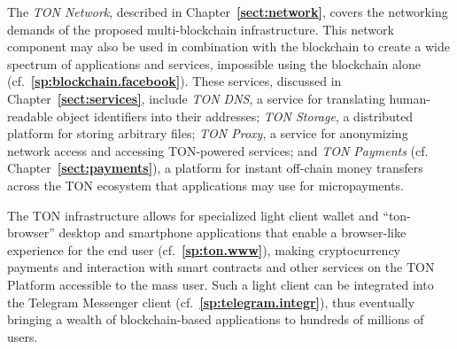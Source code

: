 \documentclass[12pt,oneside]{article}
\def\refpoint#1{{\rm\textbf{\ref{#1}}}}
\let\ptref=\refpoint
\def\markbothsame#1{\fancyhead[C]{#1}}
\begin{document}
The {\em TON Network}, described in Chapter~\ptref{sect:network},
covers the networking demands of the proposed multi-blockchain
infrastructure. This network component may also be used in combination
with the blockchain to create a wide spectrum of applications and
services, impossible using the blockchain alone
(cf.~\ptref{sp:blockchain.facebook}). These services, discussed in
Chapter~\ptref{sect:services}, include {\em TON DNS}, a service for
translating human-readable object identifiers into their addresses;
{\em TON Storage}, a distributed platform for storing arbitrary files;
{\em TON Proxy}, a service for anonymizing network access and
accessing TON-powered services; and {\em TON Payments\/}
(cf. Chapter~\ptref{sect:payments}), a platform for instant off-chain
money transfers across the TON ecosystem that applications may use for
micropayments.

The TON infrastructure allows for specialized light client wallet and
``ton-browser'' desktop and smartphone applications that enable a
browser-like experience for the end user (cf.~\ptref{sp:ton.www}),
making cryptocurrency payments and interaction with smart contracts
and other services on the TON Platform accessible to the mass
user. Such a light client can be integrated into the Telegram
Messenger client (cf.~\ptref{sp:telegram.integr}), thus eventually
bringing a wealth of blockchain-based applications to hundreds of
millions of users.

%
%
%
%

\clearpage
\markbothsame{\textsc{References}}
\end{document}
